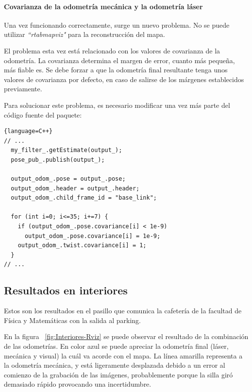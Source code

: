 \paragraph{Covarianza de la odometría mecánica y la odometría láser}
\hspace{0pt}

Una vez funcionando correctamente, surge un nuevo problema. No se puede utilizar
\textit{``rtabmapviz"} para la reconstrucción del mapa.

El problema esta vez está relacionado con los valores de covarianza de la
odometría. La covarianza determina el margen de error, cuanto más pequeña, más
fiable es. Se debe forzar a que la odometría final resultante tenga unos valores
de covarianza por defecto, en caso de salirse de los márgenes establecidos
previamente.

Para solucionar este problema, es necesario modificar una vez más parte del
código fuente del paquete:
\\
\begin{lstlisting}{language=C++}
// ...
  my_filter_.getEstimate(output_);
  pose_pub_.publish(output_);
  
  output_odom_.pose = output_.pose;
  output_odom_.header = output_.header;
  output_odom_.child_frame_id = "base_link";

  for (int i=0; i<=35; i+=7) {
    if (output_odom_.pose.covariance[i] < 1e-9)
      output_odom_.pose.covariance[i] = 1e-9;
    output_odom_.twist.covariance[i] = 1;
  }
// ...
\end{lstlisting}

\subsection{Resultados en interiores}

Estos son los resultados en el pasillo que comunica la cafetería de la facultad
de Física y Matemáticas con la salida al parking.

En la figura ~\ref{fig:Interiores-Rviz} se puede observar el resultado de la
combinación de las odometrías. En color azul se puede apreciar la odometría
final (láser, mecánica y visual) la cuál va acorde con el mapa. La línea
amarilla representa a la odometría mecánica, y está ligeramente desplazada
debido a un error al comienzo de la grabación de las imágenes, probablemente
porque la silla giró demasiado rápido provocando una incertidumbre.


